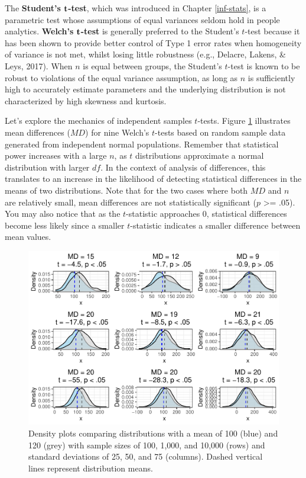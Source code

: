 \documentclass[
]{book}
\begin{document}
The \textbf{Student's} \(\textbf t\)\textbf{-test}, which was introduced in Chapter \ref{inf-stats}, is a parametric test whose assumptions of equal variances seldom hold in people analytics. \textbf{Welch's} \(\textbf t\)\textbf{-test} is generally preferred to the Student's \(t\)-test because it has been shown to provide better control of Type 1 error rates when homogeneity of variance is not met, whilst losing little robustness (e.g., Delacre, Lakens, \& Leys, 2017). When \(n\) is equal between groups, the Student's \(t\)-test is known to be robust to violations of the equal variance assumption, as long as \(n\) is sufficiently high to accurately estimate parameters and the underlying distribution is not characterized by high skewness and kurtosis.

Let's explore the mechanics of independent samples \(t\)-tests. Figure \ref{fig:mean-group-diff} illustrates mean differences (\(MD\)) for nine Welch's \(t\)-tests based on random sample data generated from independent normal populations. Remember that statistical power increases with a large \(n\), as \(t\) distributions approximate a normal distribution with larger \(df\). In the context of analysis of differences, this translates to an increase in the likelihood of detecting statistical differences in the means of two distributions. Note that for the two cases where both \(MD\) and \(n\) are relatively small, mean differences are not statistically significant (\(p\) \textgreater= .05). You may also notice that as the \(t\)-statistic approaches 0, statistical differences become less likely since a smaller \(t\)-statistic indicates a smaller difference between mean values.

\begin{figure}

{\centering \includegraphics[width=1\linewidth]{The_Fundamentals_of_People_Analytics_files/figure-latex/mean-group-diff-1} 

}

\caption{Density plots comparing distributions with a mean of 100 (blue) and 120 (grey) with sample sizes of 100, 1,000, and 10,000 (rows) and standard deviations of 25, 50, and 75 (columns). Dashed vertical lines represent distribution means.}\label{fig:mean-group-diff}
\end{figure}
\end{document}
